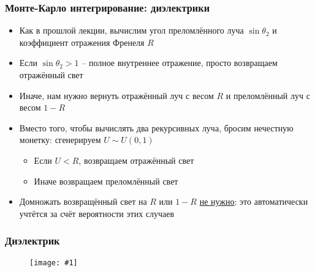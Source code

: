 \documentclass[10pt]{beamer}
\newcommand{\slideimage}[1]{
  \begin{figure}
    \begin{adjustbox}{width=\textwidth, totalheight=\textheight-2\baselineskip-2\baselineskip,keepaspectratio}
      \texttt{[image: \#1]}
    \end{adjustbox}
  \end{figure}
}
\begin{document}
\begin{frame}[fragile]
\frametitle{Монте-Карло интегрирование: диэлектрики}
\begin{itemize}
\item Как в прошлой лекции, вычислим угол преломлённого луча \begin{math}\sin\theta_2\end{math} и коэффициент отражения Френеля \begin{math}R\end{math}
\pause
\item Если \begin{math}\sin\theta_2 > 1\end{math} -- полное внутреннее отражение, просто возвращаем отражённый свет
\pause
\item Иначе, нам нужно вернуть отражённый луч с весом \begin{math}R\end{math} и преломлённый луч с весом \begin{math}1-R\end{math}
\pause
\item Вместо того, чтобы вычислять два рекурсивных луча, бросим нечестную монетку: сгенерируем \begin{math}U \sim U(0,1)\end{math}
\pause
\begin{itemize}
\item Если \begin{math}U < R\end{math}, возвращаем отражённый свет
\pause
\item Иначе возвращаем преломлённый свет
\end{itemize}
\pause
\item Домножать возвращённый свет на \begin{math}R\end{math} или \begin{math}1-R\end{math} \underline{не нужно}: это автоматически учтётся за счёт вероятности этих случаев
\end{itemize}
\end{frame}

\begin{frame}[fragile]
\frametitle{Диэлектрик}
\slideimage{cool5.png}
\end{frame}
\end{document}
